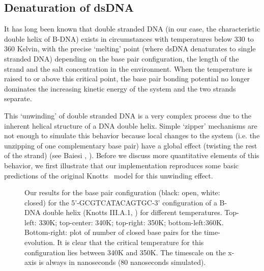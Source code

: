 \subsection{Denaturation of dsDNA}

It has long been known that double stranded DNA (in our case, the characteristic double helix of B-DNA) exists in circumstances with temperatures below 330 to 360 Kelvin, with the precise `melting' point (where dsDNA denaturates to single stranded DNA) depending on the base pair configuration, the length of the strand and the salt concentration in the environment.
When the temperature is raised to or above this critical point, the base pair bonding potential no longer dominates the increasing kinetic energy of the system and the two strands separate. 

This `unwinding' of double stranded DNA is a very complex process due to the inherent helical structure of a DNA double helix.
Simple `zipper' mechanisms are not enough to simulate this behavior because local changes to the system (i.e. the unzipping of one complementary base pair) have a global effect (twisting the rest of the strand) (see Baiesi \etal, \cite{carlon2010unwinding}).
Before we discuss more quantitative elements of this behavior, we first illustrate that our implementation reproduces some basic predictions of the original Knotts \etal\ model \cite{knotts2007coarse} for this unwinding effect.


\begin{figure}[hbt] \begin{minipage}{4.5cm}
 \end{minipage} \begin{minipage}{4.5cm}  \end{minipage}
\begin{minipage}{4cm}
 \end{minipage}
\begin{center}
\begin{minipage}{6cm}\end{minipage}
\begin{minipage}{6cm}\end{minipage}
\caption{Our results for the base pair configuration (black: open, white: closed) for the 5'-GCGTCATACAGTGC-3' configuration of a B-DNA double helix (Knotts III.A.1, \cite{knotts2007coarse}) for different temperatures. Top-left: 330K; top-center: 340K; top-right: 350K; bottom-left:360K. Bottom-right: plot of number of closed base pairs for the time-evolution. It is clear that the critical temperature for this configuration lies between 340K and 350K. The timescale on the x-axis is always in nanoseconds (80 nanoseconds simulated).  } \label{knotts1_configs}\end{center}
\end{figure}


